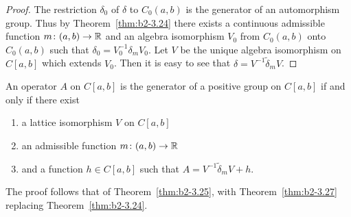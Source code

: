 \begin{proof}
The restriction $\delta_{0}$ of\/ $\delta$ to $C_{0}(a,b)$ is the generator of an automorphism group.
Thus by Theorem~\ref{thm:b2-3.24} there exists a continuous admissible function $m \colon (a,b) \to \mathbb{R}$ and an algebra isomorphism $V_{0}$ from $C_{0}(a,b)$ onto $C_{0}(a,b)$ such that $\delta_{0} = V_{0}^{-1}\delta_{m}V_{0}$.
Let $V$ be the unique algebra isomorphism on $C[a,b]$ which extends $V_{0}$.
Then it is easy to see that $\delta = V^{-1}\tilde{\delta}_{m}V$.
\end{proof}
\begin{theorem}\label{thm:b2-3.28}
%
An operator $A$ on $C[a,b]$ is the generator of a positive group on $C[a,b]$ if and only if there exist
\begin{enumerate}[\upshape (i)]
\item 
a lattice isomorphism $V$ on $C[a,b]$
\item 
an admissible function $m \colon (a,b) \to \mathbb{R}$
\item 
and a function $h \in C[a,b]$ such that $A = V^{-1}\tilde{\delta}_{m}V + h$.
\end{enumerate}
\end{theorem}
The proof follows that of Theorem~\ref{thm:b2-3.25}, with
Theorem~\ref{thm:b2-3.27} replacing Theorem~\ref{thm:b2-3.24}.
